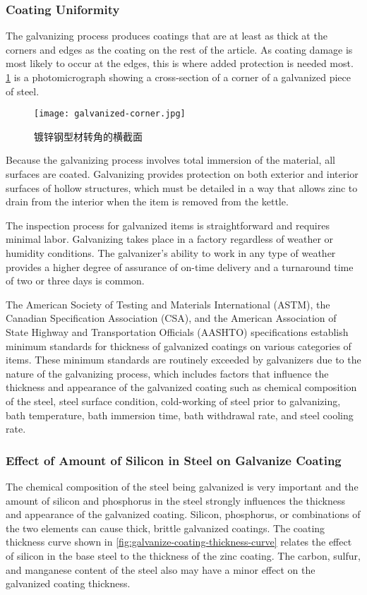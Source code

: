 \subsubsection{Coating Uniformity}
The galvanizing process produces coatings that are at least as thick at the corners and edges as the coating on the
rest of the article. As coating damage is most likely to occur at the edges, this is where added protection is needed
most. \cref{fig:galvanized-corner} is a photomicrograph showing a cross-section of a corner of a galvanized piece of steel.

\begin{figure}
  \texttt{[image: galvanized-corner.jpg]}
  \caption{镀锌钢型材转角的横截面}
  \label{fig:galvanized-corner}
\end{figure}

Because the galvanizing process involves total immersion of the material, all surfaces are coated. Galvanizing
provides protection on both exterior and interior surfaces of hollow structures, which must be detailed in a way that
allows zinc to drain from the interior when the item is removed from the kettle.

The inspection process for galvanized items is straightforward and requires minimal labor. Galvanizing takes
place in a factory regardless of weather or humidity conditions. The galvanizer’s ability to work in any type of
weather provides a higher degree of assurance of on-time delivery and a turnaround time of two or three days is
common.

The American Society of Testing and Materials International (ASTM), the Canadian Specification Association
(CSA), and the American Association of State Highway and Transportation Officials (AASHTO) specifications
establish minimum standards for thickness of galvanized coatings on various categories of items. These minimum
standards are routinely exceeded by galvanizers due to the nature of the galvanizing process, which includes factors
that influence the thickness and appearance of the galvanized coating such as chemical composition of the steel, steel surface condition, cold-working of steel prior to galvanizing, bath temperature, bath immersion time, bath withdrawal
rate, and steel cooling rate.

\subsubsection{Effect of Amount of Silicon in Steel on Galvanize Coating}
The chemical composition of the steel being galvanized is very important and the amount of silicon and
phosphorus in the steel strongly influences the thickness and appearance of the galvanized coating. Silicon,
phosphorus, or combinations of the two elements can cause thick, brittle galvanized coatings. The coating thickness
curve shown in \cref{fig:galvanize-coating-thickness-curve} relates the effect of silicon in the base steel to the thickness of the zinc coating. The
carbon, sulfur, and manganese content of the steel also may have a minor effect on the galvanized coating thickness.

